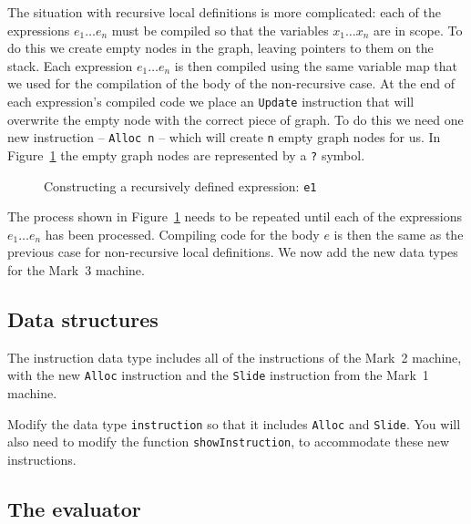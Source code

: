 The situation with recursive local definitions is more complicated:
each of the expressions $e_1 \ldots e_n$ must be compiled so that the
variables $x_1\ldots x_n$ are in scope. To do this we create empty
nodes in the graph, leaving pointers to them on the stack. Each
expression $e_1 \ldots e_n$ is then compiled using the same variable
map that we used for the compilation of the body of the non-recursive
case. At the end of each expression's compiled code we place an
\mbox{\tt Update} instruction that will overwrite the empty node with the
correct piece of graph.
To do this we need one new instruction -- \mbox{\tt Alloc\ n} -- which will
create \mbox{\tt n} empty graph nodes for us. In Figure~\ref{gm:fig:letrec} the
empty graph nodes are represented by a \mbox{\tt ?} symbol.
\begin{figure} %

\caption{Constructing a recursively defined expression: \mbox{\tt e1}}
\label{gm:fig:letrec}
\end{figure}

The process shown in Figure~\ref{gm:fig:letrec} needs to be repeated
until each of the expressions $e_1\ldots e_n$ has been processed.
Compiling code for the body $e$ is then the same as the previous case
for non-recursive local definitions. We now add the new data types for
the Mark~3 machine.

\subsection{Data structures}

The instruction data type includes all of the instructions of the
Mark~2 machine, with the new \mbox{\tt Alloc} instruction and the \mbox{\tt Slide}
instruction from the Mark~1 machine.

\begin{exercise}\label{gm:X:instruction3}
Modify the data type \mbox{\tt instruction} so that it includes \mbox{\tt Alloc} and
\mbox{\tt Slide}.  You will also need to modify the function \mbox{\tt showInstruction},
to accommodate these new instructions.
\end{exercise}

\subsection{The evaluator}
\label{gm:sc:evaluator3}

